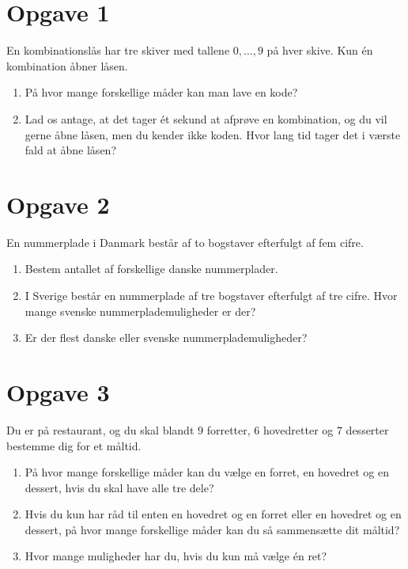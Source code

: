 \section*{Opgave 1}
En kombinationslås har tre skiver med tallene $0,\hdots, 9$ på hver skive. Kun én kombination åbner låsen.
\begin{enumerate}[label=\roman*)]
\item På hvor mange forskellige måder kan man lave en kode?
\item Lad os antage, at det tager ét sekund at afprøve en kombination, og du vil gerne åbne låsen, men du kender ikke koden. Hvor lang tid tager det i værste fald at åbne låsen?
\end{enumerate}

\section*{Opgave 2}
En nummerplade i Danmark består af to bogstaver efterfulgt af fem cifre. 
\begin{enumerate}[label=\roman*)]
\item Bestem antallet af forskellige danske nummerplader.
\item I Sverige består en nummerplade af tre bogstaver efterfulgt af tre cifre. Hvor mange svenske nummerplademuligheder er der?
\item Er der flest danske eller svenske nummerplademuligheder?
\end{enumerate}

\section*{Opgave 3}
Du er på restaurant, og du skal blandt 9 forretter, 6 hovedretter og 7 desserter bestemme dig for et måltid. 
\begin{enumerate}[label=\roman*)]
\item På hvor mange forskellige måder kan du vælge en forret, en hovedret og en dessert, hvis du skal have alle tre dele?
\item Hvis du kun har råd til enten en hovedret og en forret eller en hovedret og en dessert, på hvor mange forskellige måder kan du så sammensætte dit måltid?
\item Hvor mange muligheder har du, hvis du kun må vælge én ret?
\end{enumerate}

